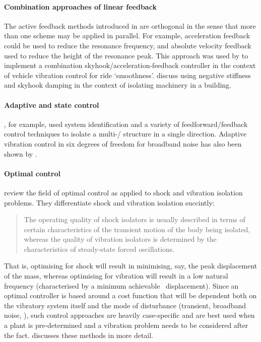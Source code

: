 \paragraph{Combination approaches of linear feedback}

The active feedback methods introduced in  are orthogonal in the sense that more than one scheme may be applied in parallel.
For example, acceleration feedback could be used to reduce the resonance frequency, and absolute velocity feedback used to reduce the height of the resonance peak.
This approach was used by \textcite{savaresi2007} to implement a combination skyhook/acceleration-feedback controller in the context of vehicle vibration control for ride `smoothness'.
\textcite{gavin2007} discuss using negative stiffness and skyhook damping in the context of isolating machinery in a building.

\paragraph{Adaptive and state control}

\textcite{guo2005}, for example, used system identification and a variety of feedforward/feedback control techniques to isolate a multi-\dof/ structure in a single direction.
Adaptive vibration control in six degrees of freedom for broadband noise has also been shown by \textcite{duindam2005}.

\paragraph{Optimal control}

\textcite{balandin1998} review the field of optimal control as applied to shock and vibration isolation problems.
They differentiate shock and vibration isolation succintly:
\begin{quote}
The operating quality of shock isolators is usually described in terms of certain characteristics of the transient motion of the body being isolated, whereas the quality of vibration isolators is determined by the characteristics of steady-state forced oscillations.
\end{quote}
That is, optimising for shock will result in minimising, say, the peak displacement of the mass, whereas optimising for vibration will result in a low natural frequency (characterised by a minimum achievable \RMS\ displacement).
Since an optimal controller is based around a cost function that will be dependent both on the vibratory system itself and the mode of disturbance (transient, broadband noise, \etc), such control approaches are heavily case-specific and are best used when a plant is pre-determined and a vibration problem needs to be considered after the fact.
\textcite{bolotnik2001} discusses these methods in more detail.

